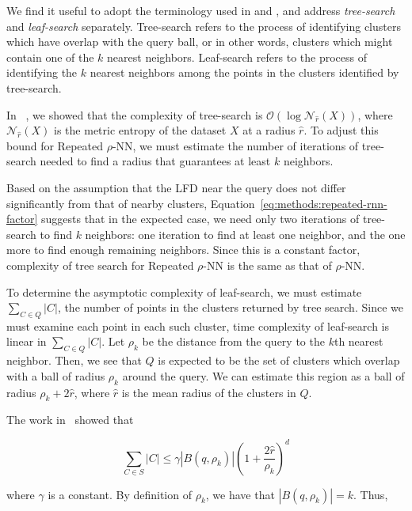 We find it useful to adopt the terminology used in \cite{ishaq2019clustered} and \cite{yu2015entropy}, and address \emph{tree-search} and \emph{leaf-search} separately.
Tree-search refers to the process of identifying clusters which have overlap with the query ball, or in other words, clusters which might contain one of the $k$ nearest neighbors. 
Leaf-search refers to the process of identifying the $k$ nearest neighbors among the points in the clusters identified by tree-search.

In ~\cite{ishaq2019clustered}, we showed that the complexity of tree-search is $\mathcal{O}(\log\mathcal{N}_{\hat{r}}(X))$, where $\mathcal{N}_{\hat{r}}(X)$ is the metric entropy of the dataset $X$ at a radius $\hat{r}$.
To adjust this bound for Repeated $\rho$-NN, we must estimate the number of iterations of tree-search needed to find a radius that guarantees at least $k$ neighbors.

Based on the assumption that the LFD near the query does not differ significantly from that of nearby clusters, Equation~\ref{eq:methods:repeated-rnn-factor} suggests that in the expected case, we need only two iterations of tree-search to find $k$ neighbors:
one iteration to find at least one neighbor, and the one more to find enough remaining neighbors.
Since this is a constant factor, complexity of tree search for Repeated $\rho$-NN is the same as that of $\rho$-NN.

To determine the asymptotic complexity of leaf-search, we must estimate $\sum_{C \in Q} |C|$, the number of points in the clusters returned by tree search.
Since we must examine each point in each such cluster, time complexity of leaf-search is linear in $\sum_{C \in Q} |C|$. 
Let $\rho_k$ be the distance from the query to the $k$th nearest neighbor.
Then, we see that $Q$ is expected to be the set of clusters which overlap with a ball of radius $\rho_k$ around the query.
We can estimate this region as a ball of radius $\rho_k + 2\hat{r}$, where $\hat{r}$ is the mean radius of the clusters in $Q$.

The work in~\cite{yu2015entropy} showed that

\begin{equation*}
    \sum_{C \in S} |C| \leq \gamma  \left| B(q, \rho_k) \right| \left(1+ \frac{2\hat{r}}{\rho_k} \right)^d
\end{equation*}

where $\gamma$ is a constant. 
By definition of $\rho_k$, we have that $|B(q, \rho_k)| = k$.
Thus,

